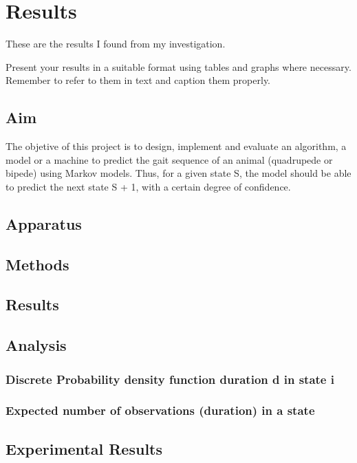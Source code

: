 \chapter{Results}
These are the results I found from my investigation.

Present your results in a suitable format using tables and graphs where necessary. Remember to refer
to them in text and caption them properly.


\section{Aim}
The objetive of this project is to design, implement and evaluate an algorithm, a model or a machine to predict the gait sequence of an animal (quadrupede or bipede) using Markov models.
Thus, for a given state S, the model should be able to predict the next state S + 1, with a certain degree of confidence.
\section{Apparatus}
\section{Methods}
\section{Results}
\section{Analysis}
\subsection{Discrete Probability density function duration d in state i}
\subsection{Expected number of observations (duration) in a state}


\section{Experimental Results}